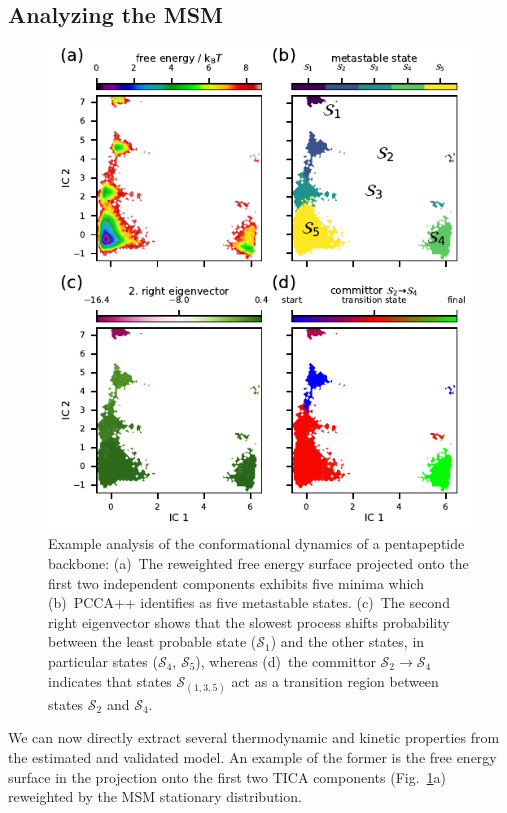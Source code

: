 \documentclass[9pt,tutorial]{livecoms}
\begin{document}
\subsection{Analyzing the MSM}

\begin{figure}
\includegraphics{figure_3}
\caption{Example analysis of the conformational dynamics of a pentapeptide backbone:
(a)~The reweighted free energy surface projected onto the first two independent components exhibits five minima which
(b)~PCCA++ identifies as five metastable states.
(c)~The second right eigenvector shows that the slowest process shifts probability between the least probable state ($\mathcal{S}_1$) and the other states, in particular states ($\mathcal{S}_4$, $\mathcal{S}_5$), whereas
(d)~the committor $\mathcal{S}_2\to\mathcal{S}_4$ indicates that states $\mathcal{S}_{(1,3,5)}$ act as a transition region between states $\mathcal{S}_2$ and $\mathcal{S}_4$.}
\label{fig:msm-analysis}
\end{figure}

We can now directly extract several thermodynamic and kinetic properties from the estimated and validated model.
An example of the former is the free energy surface in the projection onto the first two TICA components (Fig.~\ref{fig:msm-analysis}a) reweighted by the MSM stationary distribution.
\end{document}
